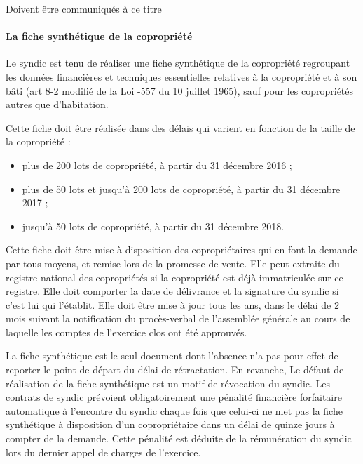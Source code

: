 			Doivent être communiqués à ce titre
			
			\paragraph{La fiche synthétique de la copropriété}
			
			\par Le syndic est tenu de réaliser une fiche synthétique de la copropriété regroupant les données
			financières et techniques essentielles relatives à la copropriété et à son bâti (art 8-2 modifié de
			la Loi -557 du 10 juillet 1965), sauf pour les copropriétés autres que d’habitation.
			
			Cette fiche doit être réalisée dans des délais qui varient en fonction de la taille de la copropriété :
			\begin{itemize}
				\item plus de 200 lots de copropriété, à partir du 31 décembre 2016 ;
				\item plus de 50 lots et jusqu'à 200 lots de copropriété, à partir du 31 décembre 2017 ;
				\item jusqu'à 50 lots de copropriété, à partir du 31 décembre 2018.
			\end{itemize}
			
			Cette fiche doit être mise à disposition des copropriétaires qui en font la demande par tous
			moyens, et remise lors de la promesse de vente. Elle peut extraite du registre national des
			copropriétés si la copropriété est déjà immatriculée sur ce registre. Elle doit comporter la date de
			délivrance et la signature du syndic si c’est lui qui l’établit. Elle doit être mise à jour tous les ans,
			dans le délai de 2 mois suivant la notification du procès-verbal de l'assemblée générale au cours
			de laquelle les comptes de l'exercice clos ont été approuvés.
			
			La fiche synthétique est le seul document dont l’absence n’a pas pour effet de reporter le point
			de départ du délai de rétractation. En revanche, Le défaut de réalisation de la fiche synthétique
			est un motif de révocation du syndic. Les contrats de syndic prévoient obligatoirement une
			pénalité financière forfaitaire automatique à l'encontre du syndic chaque fois que celui-ci ne met
			pas la fiche synthétique à disposition d'un copropriétaire dans un délai de quinze jours à compter
			de la demande. Cette pénalité est déduite de la rémunération du syndic lors du dernier appel de
			charges de l'exercice.
			
